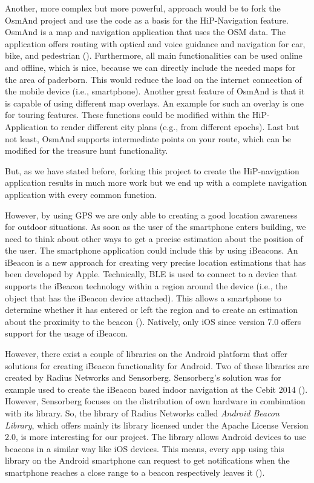 Another, more complex but more powerful, approach would be to fork the \ac{OsmAnd} project and use the code as a basis for the HiP-Navigation feature. \ac{OsmAnd} is a map and navigation application that uses the \ac{OSM} data. The application offers routing with optical and voice guidance and navigation for car, bike, and pedestrian (\cite{osmand}). Furthermore, all main functionalities can be used online and offline, which is nice, because we can directly include the needed maps for the area of paderborn. This would reduce the load on the internet connection of the mobile device (i.e., smartphone). Another great feature of \ac{OsmAnd} is that it is capable of using different map overlays. An example for such an overlay is one for touring features. These functions could be modified within the HiP-Application to render different city plans (e.g., from different epochs). Last but not least, \ac{OsmAnd} supports intermediate points on your route, which can be modified for the treasure hunt functionality.

But, as we have stated before, forking this project to create the \ac{HiP}-navigation application results in much more work but we end up with a complete navigation application with every common function. 

However, by using \ac{GPS} we are only able to creating a good location awareness for outdoor situations. As soon as the user of the smartphone enters building, we need to think about other ways to get a precise estimation about the position of the user. The smartphone application could include this by using iBeacons. 
An iBeacon is a new approach for creating very precise location estimations that has been developed by Apple. Technically, \ac{BLE} is used to connect to a device that supports the iBeacon technology within a region around the device (i.e., the object that has the iBeacon device attached). This allows a smartphone to determine whether it has entered or left the region and to create an estimation about the proximity to the beacon (\cite{Apple:2014aa}). Natively, only iOS since version 7.0 offers support for the usage of iBeacon.

However, there exist a couple of libraries on the Android platform that offer solutions for creating iBeacon functionality for Android. Two of these libraries are created by Radius Networks and Sensorberg. Sensorberg's solution was for example used to create the iBeacon based indoor navigation at the Cebit 2014 (\cite{Kaufmann:2014aa}). However, Sensorberg focuses on the distribution of own hardware in combination with its library. So, the library of Radius Networks called \emph{Android Beacon Library}, which offers mainly its library licensed under the Apache License Version 2.0, is more interesting for our project. The library allows Android devices to use beacons in a similar way like iOS devices. This means, every app using this library on the Android smartphone can request to get notifications when the smartphone reaches a close range to a beacon respectively leaves it (\cite{RadiusNetworks:2015aa}). 

